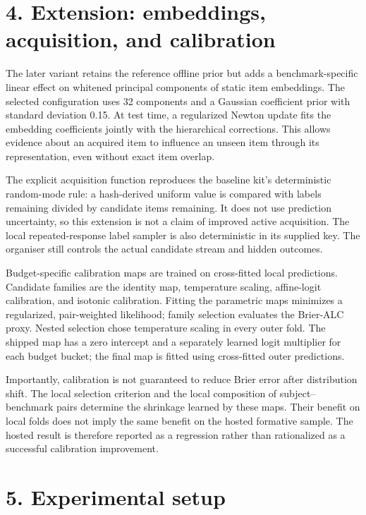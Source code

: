 \documentclass{article}
\begin{document}
\section{4. Extension: embeddings, acquisition, and calibration}\label{extension-embeddings-acquisition-and-calibration}

The later variant retains the reference offline prior but adds a benchmark-specific linear effect on whitened principal components of static item embeddings. The selected configuration uses 32 components and a Gaussian coefficient prior with standard deviation 0.15. At test time, a regularized Newton update fits the embedding coefficients jointly with the hierarchical corrections. This allows evidence about an acquired item to influence an unseen item through its representation, even without exact item overlap.

The explicit acquisition function reproduces the baseline kit's deterministic random-mode rule: a hash-derived uniform value is compared with labels remaining divided by candidate items remaining. It does not use prediction uncertainty, so this extension is not a claim of improved active acquisition. The local repeated-response label sampler is also deterministic in its supplied key. The organiser still controls the actual candidate stream and hidden outcomes.

Budget-specific calibration maps are trained on cross-fitted local predictions. Candidate families are the identity map, temperature scaling, affine-logit calibration, and isotonic calibration. Fitting the parametric maps minimizes a regularized, pair-weighted likelihood; family selection evaluates the Brier-ALC proxy. Nested selection chose temperature scaling in every outer fold. The shipped map has a zero intercept and a separately learned logit multiplier for each budget bucket; the final map is fitted using cross-fitted outer predictions.

Importantly, calibration is not guaranteed to reduce Brier error after distribution shift. The local selection criterion and the local composition of subject--benchmark pairs determine the shrinkage learned by these maps. Their benefit on local folds does not imply the same benefit on the hosted formative sample. The hosted result is therefore reported as a regression rather than rationalized as a successful calibration improvement.

\section{5. Experimental setup}\label{experimental-setup}
\end{document}
